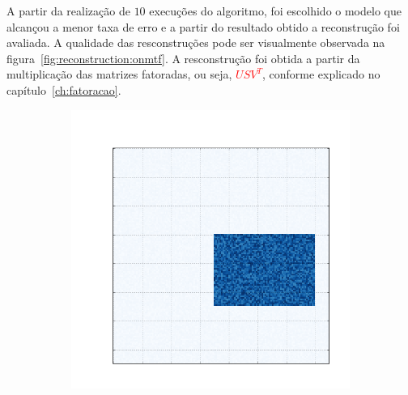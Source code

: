 \documentclass[
    12pt,                %
    oneside,            %
    a4paper,            %
    english,            %
    brazil                %
    ]{abntex2ppgsi}
\begin{document}
A partir da realização de $10$ execuções do algoritmo, foi escolhido o modelo que alcançou a menor taxa de erro e a partir do resultado obtido a reconstrução foi avaliada. A qualidade das resconstruções pode ser visualmente observada na figura~\ref{fig:reconstruction:onmtf}. A resconstrução foi obtida a partir da multiplicação das matrizes fatoradas, ou seja, \textcolor{red}{$USV^T$}, conforme explicado no capítulo~\ref{ch:fatoracao}.
\begin{figure}[H]
\centering
    \caption{
        As primeiras cinco matrizes são as matrizes originais, as demais são suas respectivas reconstruções, realizadas a partir dos resultados obtidos com o algoritmo \textit{ONMTF}.
    }
    \begin{subfigure}[b]{0.18\textwidth}
        \includegraphics[width=\textwidth]{img/a-bic-structure.png}
    \end{subfigure}
    \begin{subfigure}[b]{0.18\textwidth}

\end{subfigure}
\end{figure}
\end{document}
